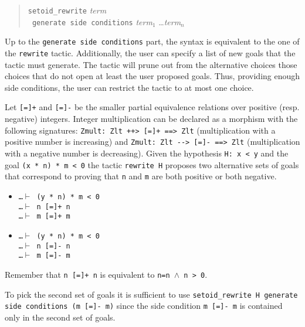 \begin{quote}
  \texttt{setoid\_rewrite}  \textit{term}
  \\
  \texttt{~generate side conditions}
  \textit{term}$_1$ \ldots \textit{term}$_n$\\
\end{quote}
Up to the \texttt{generate side conditions} part, the syntax is 
equivalent to the
one of the \texttt{rewrite} tactic. Additionally, the user can specify a list
of new goals that the tactic must generate. The tactic will prune out from
the alternative choices those choices that do not open at least the user
proposed goals. Thus, providing enough side conditions, the user can restrict
the tactic to at most one choice.

\begin{cscexample}
Let \texttt{[=]+} and \texttt{[=]-} be the smaller partial equivalence
relations over positive (resp. negative) integers. Integer multiplication
can be declared as a morphism with the following signatures:
\texttt{Zmult: Zlt ++> [=]+ ==> Zlt} (multiplication with a positive number
is increasing) and
\texttt{Zmult: Zlt -{}-> [=]- ==> Zlt} (multiplication with a negative number
is decreasing).
Given the hypothesis \texttt{H: x < y} and the goal
\texttt{(x * n) * m < 0} the tactic \texttt{rewrite H} proposes
two alternative sets of goals that correspond to proving that \texttt{n}
and \texttt{m} are both positive or both negative.
\begin{itemize}
 \item \texttt{\ldots $\vdash$ (y * n) * m < 0}\\
       \texttt{\ldots $\vdash$ n [=]+ n}\\
       \texttt{\ldots $\vdash$ m [=]+ m}\\
 \item \texttt{\ldots $\vdash$ (y * n) * m < 0}\\
       \texttt{\ldots $\vdash$ n [=]- n} \\
       \texttt{\ldots $\vdash$ m [=]- m}
\end{itemize}
Remember that \texttt{n [=]+ n} is equivalent to \texttt{n=n $\land$ n > 0}.

To pick the second set of goals it is sufficient to use
\texttt{setoid\_rewrite H generate side conditions (m [=]- m)}
since the side condition \texttt{m [=]- m} is contained only in the second set
of goals.
\end{cscexample}

